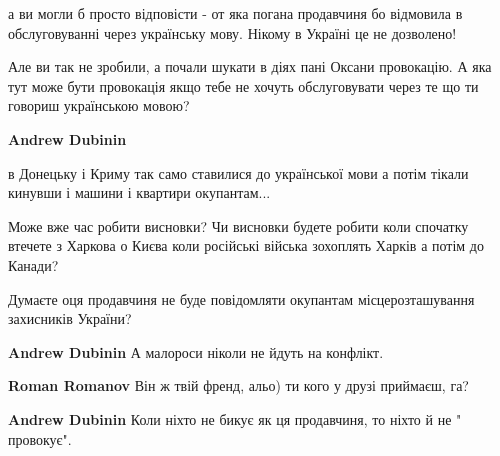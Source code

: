 \begin{itemize}
\begin{itemize}
а ви могли б просто відповісти - от яка погана продавчиня бо відмовила в
обслуговуванні через українську мову. Нікому в Україні це не дозволено!

Але ви так не зробили, а почали шукати в діях пані Оксани провокацію. А яка тут
може бути провокація якщо тебе не хочуть обслуговувати через те що ти говориш
українською мовою?

 
\textbf{Andrew Dubinin} 

в Донецьку і Криму так само ставилися до української мови а потім тікали
кинувши і машини і квартири окупантам...

Може вже час робити висновки? Чи висновки будете робити коли спочатку втечете з
Харкова о Києва коли російські війська зохоплять Харків а потім до Канади?

Думаєте оця продавчиня не буде повідомляти окупантам місцерозташування
захисників України?


 
\textbf{Andrew Dubinin} А малороси ніколи не йдуть на конфлікт.

 
\textbf{Roman Romanov} Він ж твій френд, альо) ти кого у друзі приймаєш, га?

 
\textbf{Andrew Dubinin} Коли ніхто не бикує як ця продавчиня, то ніхто й не " провокує".

 

\end{itemize}
\end{itemize}
